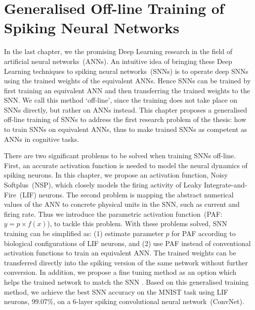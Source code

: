 \chapter{Generalised Off-line Training of Spiking Neural Networks}
\label{cha:Conv}

In the last chapter, we \DIFdelbegin {}\DIFdelend \DIFaddbegin {}\DIFaddend the promising Deep Learning research in the field of artificial neural networks~(ANNs). 
An intuitive idea of bringing these Deep Learning techniques to spiking neural networks~(SNNs) is to operate deep SNNs using the trained weights of the equivalent ANNs.
Hence SNNs can be trained by first training an equivalent ANN and then transferring the trained weights to the SNN.
We call this method `off-line', since the training does not take place on SNNs directly, but rather on ANNs instead.
This chapter proposes a generalised off-line training of SNNs to address the first research problem of the thesis: how to train SNNs on equivalent ANNs, thus to make trained SNNs as competent as ANNs in cognitive tasks. 


There are two significant problems to be solved when training SNNs off-line.
First, an accurate activation function is needed to model the neural dynamics of spiking neurons.
In this chapter, we propose an activation function, 
Noisy Softplus~(NSP), which closely models the \DIFdelbegin {}\DIFdelend firing activity of Leaky Integrate-and-Fire~(LIF) neurons.
The second problem is mapping the abstract numerical values of the ANN to concrete physical units in the SNN, such as current and firing rate.
Thus we introduce the parametric activation function~(PAF: $y = p \times f(x)$), to tackle this problem.
With these problems solved, SNN training can be simplified as: (1) estimate parameter $p$ for \DIFaddbegin {}\DIFaddend PAF according to biological configurations of LIF neurons, and (2) use \DIFaddbegin {}\DIFaddend PAF instead of conventional activation functions to train an equivalent ANN.
The trained weights can be transferred directly into the spiking version of the same network without further conversion.
In addition, we propose a fine tuning method as an option which helps the trained network to \DIFdelbegin {}\DIFdelend match the SNN \DIFaddbegin {}\DIFaddend .
Based on this generalised training method, we achieve the best SNN accuracy on the MNIST task using LIF neurons, 99.07\%, on a 6-layer spiking convolutional neural network~(ConvNet).

